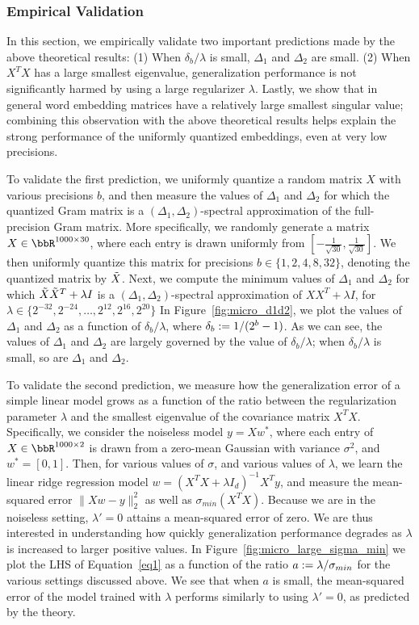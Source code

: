 \subsubsection{Empirical Validation}
\label{sec:theory_validation}
In this section, we empirically validate two important predictions made by the above theoretical results: (1) When $\delta_b/\lambda$ is small, $\Delta_1$ and $\Delta_2$ are small. (2) When $X^T X$ has a large smallest eigenvalue, generalization performance is not significantly harmed by using a large regularizer $\lambda$.
Lastly, we show that in general word embedding matrices have a relatively large smallest singular value;
combining this observation with the above theoretical results helps explain the strong performance of the uniformly quantized embeddings, even at very low precisions.

To validate the first prediction, we uniformly quantize a random matrix $X$ with various precisions $b$, and then measure the values of $\Delta_1$ and $\Delta_2$ for which the quantized Gram matrix is a $(\Delta_1,\Delta_2)$-spectral approximation of the full-precision Gram matrix.
More specifically, we randomly generate a matrix $X \in \RR^{1000 \times 30}$, where each entry is drawn uniformly from $[-\frac{1}{\sqrt{30}},\frac{1}{\sqrt{30}}]$.
We then uniformly quantize this matrix for precisions $b \in \{1,2,4,8,32\}$, denoting the quantized matrix by $\tX$.
Next, we compute the minimum values of $\Delta_1$ and $\Delta_2$ for which $\tX\tX^T + \lambda I$ is a $(\Delta_1,\Delta_2)$-spectral approximation of $XX^T + \lambda I$, for $\lambda \in \{2^{-32}, 2^{-24}, \ldots, 2^{12}, 2^{16}, 2^{20}\}$ 
In Figure~\ref{fig:micro_d1d2}, we plot the values of $\Delta_1$ and $\Delta_2$ as a function of $\delta_b/\lambda$, where $\delta_b \defeq 1/(2^b-1)$.
As we can see, the values of $\Delta_1$ and $\Delta_2$ are largely governed by the value of $\delta_b/\lambda$; when $\delta_b/\lambda$ is small, so are $\Delta_1$ and $\Delta_2$.

To validate the second prediction, we measure how the generalization error of a simple linear model grows as a function of the ratio between the regularization parameter $\lambda$ and the smallest eigenvalue of the covariance matrix $X^T X$.
Specifically, we consider the noiseless model $y = Xw^*$, where each entry of $X \in \RR^{1000 \times 2}$ is drawn from a zero-mean Gaussian with variance $\sigma^2$, and $w^*=[0,1]$.
Then, for various values of $\sigma$, and various values of $\lambda$, we learn the linear ridge regression model $w = (X^T X + \lambda I_d)^{-1}X^Ty$, and measure the mean-squared error $\|Xw-y\|_2^2$ as well as $\sigma_{min}(X^T X)$.
Because we are in the noiseless setting, $\lambda'=0$ attains a mean-squared error of zero.
We are thus interested in understanding how quickly generalization performance degrades as $\lambda$ is increased to larger positive values.
In Figure~\ref{fig:micro_large_sigma_min} we plot the LHS of Equation~\eqref{eq1} as a function of the ratio $a \defeq \lambda/\sigma_{min}$ for the various settings discussed above.
We see that when $a$ is small, the mean-squared error of the model trained with $\lambda$ performs similarly to using $\lambda'=0$, as predicted by the theory.

